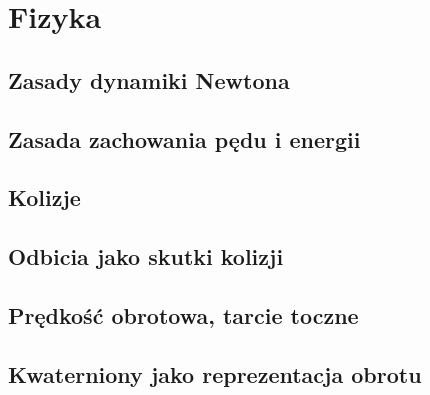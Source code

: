 \section{Fizyka}
\subsection{Zasady dynamiki Newtona}
\subsection{Zasada zachowania pędu i energii}
\subsection{Kolizje}
\subsection{Odbicia jako skutki kolizji}
\subsection{Prędkość obrotowa, tarcie toczne}
\subsection{Kwaterniony jako reprezentacja obrotu}
